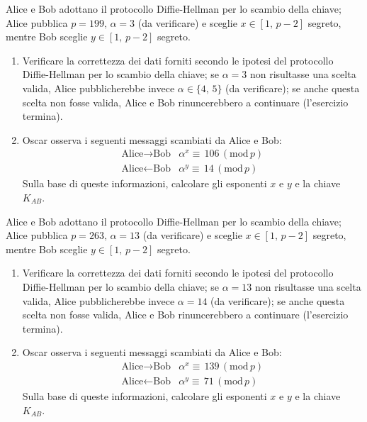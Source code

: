         Alice e Bob adottano il protocollo Diffie-Hellman per lo scambio della chiave; Alice pubblica 
        $p=199,\, \alpha=3$ (da verificare) e sceglie $x\in [1,\,p-2]$ segreto, mentre Bob sceglie $y\in [1,\,p-2]$ 
        segreto.
        \begin{enumerate}
            \item Verificare la correttezza dei dati forniti secondo le ipotesi del protocollo Diffie-Hellman 
                per lo scambio della chiave; se $\alpha=3$ non risultasse una scelta valida, Alice 
                pubblicherebbe invece $\alpha \in \{4,\,5\}$ (da verificare); se anche questa scelta 
                non fosse valida, Alice e Bob rinuncerebbero a continuare (l'esercizio termina).
            \item Oscar osserva i seguenti messaggi scambiati da Alice e Bob: \[
            \begin{array}{ll}
                \text{Alice} \rightarrow \text{Bob} & \alpha^{x} \equiv\,106\,(\mathrm{mod}\,p)\\
                \text{Alice} \leftarrow \text{Bob} & \alpha^{y} \equiv\,14\,(\mathrm{mod}\,p)
            \end{array}
            \] Sulla base di queste informazioni, calcolare gli esponenti $x$ e $y$ e la chiave $K_{AB}$.
        \end{enumerate}

        Alice e Bob adottano il protocollo Diffie-Hellman per lo scambio della chiave; Alice pubblica 
        $p=263,\, \alpha=13$ (da verificare) e sceglie $x\in [1,\,p-2]$ segreto, mentre Bob sceglie $y\in [1,\,p-2]$ 
        segreto.
        \begin{enumerate}
            \item Verificare la correttezza dei dati forniti secondo le ipotesi del protocollo Diffie-Hellman 
                per lo scambio della chiave; se $\alpha=13$ non risultasse una scelta valida, Alice 
                pubblicherebbe invece $\alpha=14$ (da verificare); se anche questa scelta 
                non fosse valida, Alice e Bob rinuncerebbero a continuare (l'esercizio termina).
            \item Oscar osserva i seguenti messaggi scambiati da Alice e Bob: \[
            \begin{array}{ll}
                \text{Alice} \rightarrow \text{Bob} & \alpha^{x} \equiv\,139\,(\mathrm{mod}\,p)\\
                \text{Alice} \leftarrow \text{Bob} & \alpha^{y} \equiv\,71\,(\mathrm{mod}\,p)
            \end{array}
            \] Sulla base di queste informazioni, calcolare gli esponenti $x$ e $y$ e la chiave $K_{AB}$.
        \end{enumerate}

